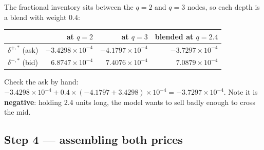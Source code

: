\documentclass[11pt,a4paper]{article}
\begin{document}
The fractional inventory sits between the $q=2$ and $q=3$ nodes, so each depth is
a blend with weight $0.4$:

\begin{center}\small
\begin{tabular}{@{}lrrr@{}}
\toprule
& \textbf{at $q=2$} & \textbf{at $q=3$} & \textbf{blended at $q=2.4$} \\
\midrule
$\delta^{+,*}$ (ask) & $-3.4298\times10^{-4}$ & $-4.1797\times10^{-4}$ & $-3.7297\times10^{-4}$ \\
$\delta^{-,*}$ (bid) & $6.8747\times10^{-4}$ & $7.4076\times10^{-4}$ & $7.0879\times10^{-4}$ \\
\bottomrule
\end{tabular}
\end{center}

Check the ask by hand: $-3.4298\times10^{-4} + 0.4\times(-4.1797 + 3.4298)\times
10^{-4} = -3.7297\times10^{-4}$. Note it is \textbf{negative}: holding 2.4 units
long, the model wants to sell badly enough to cross the mid.

\subsection{Step 4 --- assembling both prices}
\end{document}
